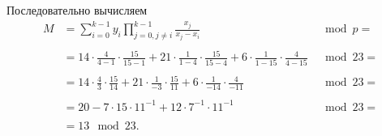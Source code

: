 Последовательно вычисляем
\[\begin{array}{llc}
M	&\displaystyle = \sum\limits_{i=0}^{k-1} y_i \prod\limits_{j=0, j \neq i}^{k-1} \frac{x_j}{x_j - x_i} & \mod p = \\
	\\
	&= 14 \cdot \frac{4}{4-1} \cdot \frac{15}{15-1} + 21 \cdot \frac{1}{1-4} \cdot \frac{15}{15-4} + 6 \cdot \frac{1}{1-15} \cdot \frac{4}{4-15} & \mod 23 = \\
	\\
	&\displaystyle = 14 \cdot \frac{4}{3} \cdot \frac{15}{14} + 21 \cdot \frac{1}{-3} \cdot \frac{15}{11} + 6 \cdot \frac{1}{-14} \cdot \frac{4}{-11} & \mod 23 = \\
	\\
	&\displaystyle = 20 - 7 \cdot 15 \cdot 11^{-1} + 12 \cdot 7^{-1} \cdot 11^{-1} & \mod 23 = \\
	\\
	&= 13 \mod 23.
\end{array}\]

\exampleend


